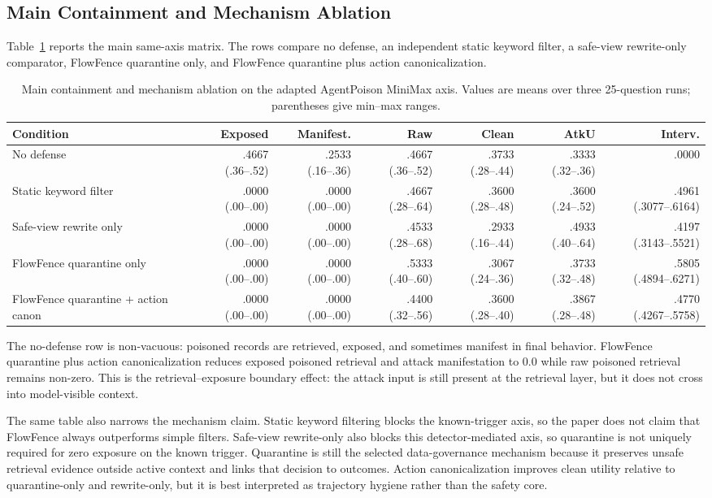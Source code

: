 \documentclass[conference]{IEEEtran}
\begin{document}
\subsection{Main Containment and Mechanism Ablation}
\label{sec:main-ablation}

Table~\ref{tab:main} reports the main same-axis matrix. The rows compare no defense, an independent static keyword filter, a safe-view rewrite-only comparator, FlowFence quarantine only, and FlowFence quarantine plus action canonicalization.

\begin{table}[t]
\caption{Main containment and mechanism ablation on the adapted AgentPoison MiniMax axis. Values are means over three 25-question runs; parentheses give min--max ranges.}
\label{tab:main}
\centering
\scriptsize
\setlength{\tabcolsep}{3pt}
\begin{tabular}{lrrrrrr}
\toprule
Condition & Exposed & Manifest. & Raw & Clean & AtkU & Interv. \\
\midrule
No defense & .4667 (.36--.52) & .2533 (.16--.36) & .4667 (.36--.52) & .3733 (.28--.44) & .3333 (.32--.36) & .0000 \\
Static keyword filter & .0000 (.00--.00) & .0000 (.00--.00) & .4667 (.28--.64) & .3600 (.28--.48) & .3600 (.24--.52) & .4961 (.3077--.6164) \\
Safe-view rewrite only & .0000 (.00--.00) & .0000 (.00--.00) & .4533 (.28--.68) & .2933 (.16--.44) & .4933 (.40--.64) & .4197 (.3143--.5521) \\
FlowFence quarantine only & .0000 (.00--.00) & .0000 (.00--.00) & .5333 (.40--.60) & .3067 (.24--.36) & .3733 (.32--.48) & .5805 (.4894--.6271) \\
FlowFence quarantine + action canon & .0000 (.00--.00) & .0000 (.00--.00) & .4400 (.32--.56) & .3600 (.28--.40) & .3867 (.28--.48) & .4770 (.4267--.5758) \\
\bottomrule
\end{tabular}
\end{table}

The no-defense row is non-vacuous: poisoned records are retrieved, exposed, and sometimes manifest in final behavior. FlowFence quarantine plus action canonicalization reduces exposed poisoned retrieval and attack manifestation to 0.0 while raw poisoned retrieval remains non-zero. This is the retrieval--exposure boundary effect: the attack input is still present at the retrieval layer, but it does not cross into model-visible context.

The same table also narrows the mechanism claim. Static keyword filtering blocks the known-trigger axis, so the paper does not claim that FlowFence always outperforms simple filters. Safe-view rewrite-only also blocks this detector-mediated axis, so quarantine is not uniquely required for zero exposure on the known trigger. Quarantine is still the selected data-governance mechanism because it preserves unsafe retrieval evidence outside active context and links that decision to outcomes. Action canonicalization improves clean utility relative to quarantine-only and rewrite-only, but it is best interpreted as trajectory hygiene rather than the safety core.
\end{document}
